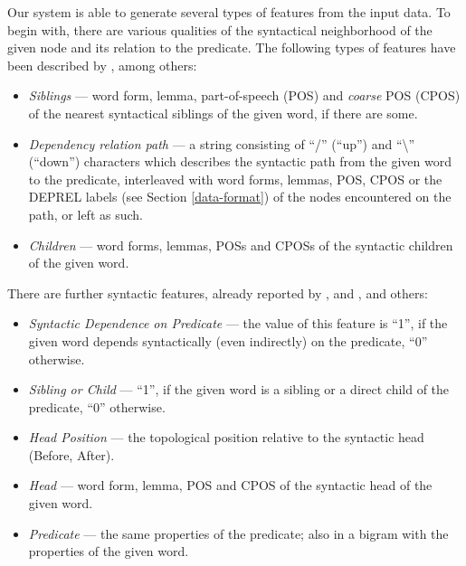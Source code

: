 \documentclass[12pt,notitlepage]{report}
\begin{document}
Our system is able to generate several types of features from the input data. To begin with, there are various qualities of the syntactical neighborhood of the given node and its relation to the predicate. The following types of features have been described by \citet{nugues09}, among others:
\begin{itemize}
    \item \emph{Siblings} --- word form, lemma, part-of-speech (POS) and \emph{coarse} POS (CPOS) \citep[first character of the POS-tag;][]{che09} of the nearest syntactical siblings of the given word, if there are some.
    \item \emph{Dependency relation path} --- a string consisting of ``/'' (``up'') and ``\textbackslash'' (``down'') characters which describes the syntactic path from the given word to the predicate, interleaved with word forms, lemmas, POS, CPOS or the DEPREL labels (see Section \ref{data-format}) of the nodes encountered on the path, or left as such.
    \item \emph{Children} --- word forms, lemmas, POSs and CPOSs of the syntactic children of the given word.
\end{itemize}

There are further syntactic features, already reported by \citet{zeman09}, \citet{chen09} and \citet{asahara09}, and others:
\begin{itemize}
    \item \emph{Syntactic Dependence on Predicate} --- the value of this feature is ``1'', if the given word depends syntactically (even indirectly) on the predicate, ``0'' otherwise.
    \item \emph{Sibling or Child} --- ``1'', if the given word is a sibling or a direct child of the predicate, ``0'' otherwise.
    \item \emph{Head Position} --- the topological position relative to the syntactic head (Before, After).
    \item \emph{Head} --- word form, lemma, POS and CPOS of the syntactic head of the given word.
    \item \emph{Predicate} --- the same properties of the predicate; also in a bigram with the properties of the given word.
\end{itemize}
\end{document}
